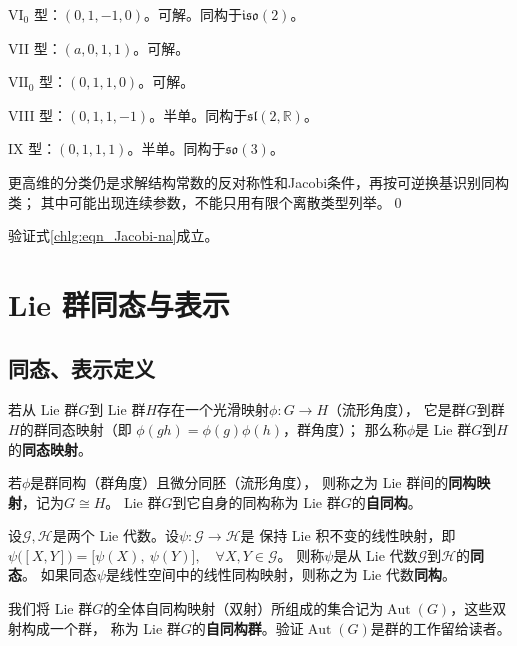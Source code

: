 {$\mathrm{VI}_0$ 型}：$(0,1,-1,0)$。可解。同构于$\mathfrak{iso}(2)$。

{VII 型}：$(a,0,1,1)$。可解。

{$\mathrm{VII}_0$ 型}：$(0,1,1,0)$。可解。

{VIII 型}：$(0,1,1,-1)$。半单。同构于$\mathfrak{sl}(2,\mathbb{R})$。

{IX 型}：$(0,1,1,1)$。半单。同构于$\mathfrak{so}(3)$。

更高维的分类仍是求解结构常数的反对称性和Jacobi条件，再按可逆换基识别同构类；
其中可能出现连续参数，不能只用有限个离散类型列举。\qed

\begin{exercise}
	验证式\eqref{chlg:eqn_Jacobi-na}成立。
\end{exercise}

\section{Lie 群同态与表示}

\subsection{同态、表示定义}\label{chlg:sec_lieiso}
\begin{definition}
    若从 Lie 群$G$到 Lie 群$H$存在一个{光滑映射}$\phi:G\to H$（流形角度），
    它是群$G$到群$H$的群同态映射（即 $\phi(gh)=\phi(g)\phi(h)$，群角度）；
    那么称$\phi$是 Lie 群$G$到$H$的\textbf{同态映射}。

    若$\phi$是群同构（群角度）且微分同胚（流形角度），
    则称之为 Lie 群间的\textbf{同构映射}，记为$G \cong H$。
     Lie 群$G$到它自身的同构称为 Lie 群$G$的\textbf{自同构}。
\end{definition}

\begin{definition}\label{chlg:def_homomorphism-LA}
    设$\mathscr{G},\mathscr{H}$是两个 Lie 代数。设$\psi:\mathscr{G}\to \mathscr{H}$是
    保持 Lie 积不变的线性映射，即
       $ \psi\bigl([X, Y]\bigr) = \bigl[\psi(X),\ \psi(Y)\bigr],
        \quad \forall X, Y \in \mathscr{G} $。
    则称$\psi$是从 Lie 代数$\mathscr{G}$到$\mathscr{H}$的\textbf{同态}。
    如果同态$\psi$是线性空间中的线性同构映射，则称之为 Lie 代数\textbf{同构}。
\end{definition}

我们将 Lie 群$G$的全体自同构映射（双射）所组成的集合记为$\operatorname{Aut}(G)$，这些双射构成一个群，
称为 Lie 群$G$的\textbf{自同构群}。验证$\operatorname{Aut}(G)$是群的工作留给读者。

